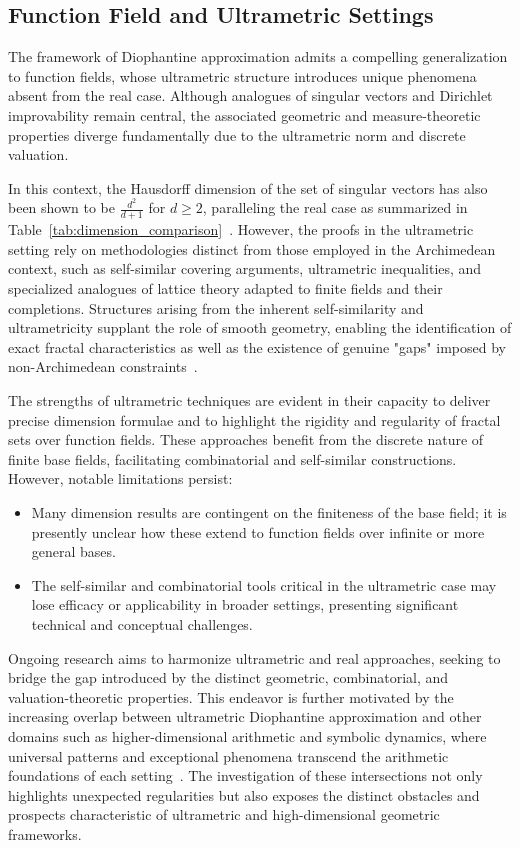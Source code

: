 \subsection{Function Field and Ultrametric Settings}

The framework of Diophantine approximation admits a compelling generalization to function fields, whose ultrametric structure introduces unique phenomena absent from the real case. Although analogues of singular vectors and Dirichlet improvability remain central, the associated geometric and measure-theoretic properties diverge fundamentally due to the ultrametric norm and discrete valuation.

In this context, the Hausdorff dimension of the set of singular vectors has also been shown to be $\frac{d^2}{d+1}$ for $d \geq 2$, paralleling the real case as summarized in Table~\ref{tab:dimension_comparison}~\cite{ref79}. However, the proofs in the ultrametric setting rely on methodologies distinct from those employed in the Archimedean context, such as self-similar covering arguments, ultrametric inequalities, and specialized analogues of lattice theory adapted to finite fields and their completions. Structures arising from the inherent self-similarity and ultrametricity supplant the role of smooth geometry, enabling the identification of exact fractal characteristics as well as the existence of genuine "gaps" imposed by non-Archimedean constraints~\cite{ref79}.

The strengths of ultrametric techniques are evident in their capacity to deliver precise dimension formulae and to highlight the rigidity and regularity of fractal sets over function fields. These approaches benefit from the discrete nature of finite base fields, facilitating combinatorial and self-similar constructions. However, notable limitations persist:

\begin{itemize}
    \item Many dimension results are contingent on the finiteness of the base field; it is presently unclear how these extend to function fields over infinite or more general bases.
    \item The self-similar and combinatorial tools critical in the ultrametric case may lose efficacy or applicability in broader settings, presenting significant technical and conceptual challenges.
\end{itemize}

Ongoing research aims to harmonize ultrametric and real approaches, seeking to bridge the gap introduced by the distinct geometric, combinatorial, and valuation-theoretic properties. This endeavor is further motivated by the increasing overlap between ultrametric Diophantine approximation and other domains such as higher-dimensional arithmetic and symbolic dynamics, where universal patterns and exceptional phenomena transcend the arithmetic foundations of each setting~\cite{ref79,ref109}. The investigation of these intersections not only highlights unexpected regularities but also exposes the distinct obstacles and prospects characteristic of ultrametric and high-dimensional geometric frameworks.

